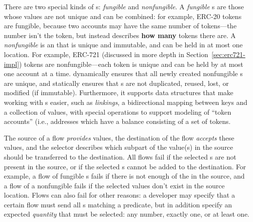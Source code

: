 \documentclass[dvipsnames, usenames, sigconf]{acmart}
\begin{document}
There are two special kinds of \assetTxt{}s: \emph{fungible} and \emph{nonfungible}.
A \emph{fungible} \assetTxt{}s are those whose values are not unique and can be combined: for example, ERC-20 tokens are fungible, because two accounts may have the same number of tokens---the number isn't the token, but instead describes \textbf{how many} tokens there are.
A \emph{nonfungible} \assetTxt is an \assetTxt that is unique and immutable, and can be held in at most one location.
For example, ERC-721  (discussed in more depth in Section~\ref{sec:erc721-impl}) tokens are nonfungible---each token is unique and can be held by at most one account at a time.
\langName dynamically ensures that all newly created nonfungible \assetTxt{}s are unique, and statically ensures that \assetTxt{}s are not duplicated, reused, lost, or modified (if immutable).
Furthermore, it supports data structures that make working with \assetTxt{}s easier, such as \emph{linkings}, a bidirectional mapping between keys and a collection of values, with special operations to support modeling of ``token accounts'' (i.e., addresses which have a balance consisting of a set of tokens.

The source of a flow \emph{provides} values, the destination of the flow \emph{accepts} these values, and the selector describes which subpart of the value(s) in the source should be transferred to the destination.
All flows fail if the selected \assetTxt{}s are not present in the source, or if the selected \assetTxt{}s cannot be added to the destination.
For example, a flow of fungible \assetTxt{}s fails if there is not enough of the \assetTxt in the source, and a flow of a nonfungible \assetTxt fails if the selected values don't exist in the source location.
Flows can also fail for other reasons: a developer may specify that a certain flow must send all \assetTxt{}s matching a predicate, but in addition specify an expected \emph{quantity} that must be selected: any number, exactly one, or at least one.
\end{document}
